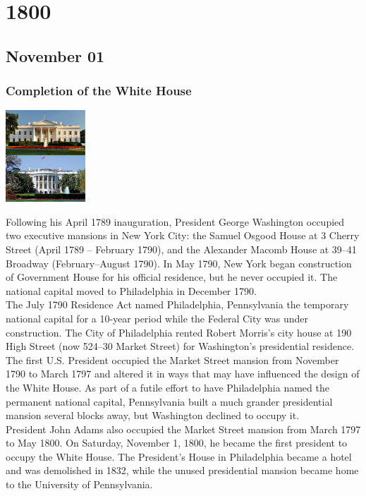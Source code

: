\documentclass[11pt]{report}
\begin{document}
\chapter{1800}
\section{November 01}
\subsection{Completion of the White House}
\vspace{2mm}\begin{center}\includegraphics[width=3cm]{./img/whiteHouse.jpg}\end{center}
Following his April 1789 inauguration, President George Washington occupied two executive mansions in New York City: the Samuel Osgood House at 3 Cherry Street (April 1789 – February 1790), and the Alexander Macomb House at 39–41 Broadway (February–August 1790). In May 1790, New York began construction of Government House for his official residence, but he never occupied it. The national capital moved to Philadelphia in December 1790.\\
\indent The July 1790 Residence Act named Philadelphia, Pennsylvania the temporary national capital for a 10-year period while the Federal City was under construction. The City of Philadelphia rented Robert Morris's city house at 190 High Street (now 524–30 Market Street) for Washington's presidential residence.\\
\indent The first U.S. President occupied the Market Street mansion from November 1790 to March 1797 and altered it in ways that may have influenced the design of the White House. As part of a futile effort to have Philadelphia named the permanent national capital, Pennsylvania built a much grander presidential mansion several blocks away, but Washington declined to occupy it.\\
\indent President John Adams also occupied the Market Street mansion from March 1797 to May 1800. On Saturday, November 1, 1800, he became the first president to occupy the White House. The President's House in Philadelphia became a hotel and was demolished in 1832, while the unused presidential mansion became home to the University of Pennsylvania.
\end{document}
